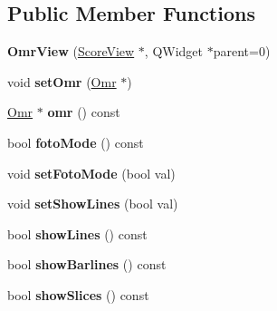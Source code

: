 \subsection*{Public Member Functions}
\begin{DoxyCompactItemize}
\item 
\mbox{\label{class_ms_1_1_omr_view_afa1b39091598c79514a603e1edc46ceb}} 
{\bfseries Omr\+View} (\hyperlink{class_ms_1_1_score_view}{Score\+View} $\ast$, Q\+Widget $\ast$parent=0)
\item 
\mbox{\label{class_ms_1_1_omr_view_a0c1d193268688ea084e67cb2d389e9c7}} 
void {\bfseries set\+Omr} (\hyperlink{class_ms_1_1_omr}{Omr} $\ast$)
\item 
\mbox{\label{class_ms_1_1_omr_view_a796985fe19ac9e85ab5a8866d3511617}} 
\hyperlink{class_ms_1_1_omr}{Omr} $\ast$ {\bfseries omr} () const
\item 
\mbox{\label{class_ms_1_1_omr_view_a06842c9103a90f04fcf2a032312af50d}} 
bool {\bfseries foto\+Mode} () const
\item 
\mbox{\label{class_ms_1_1_omr_view_a4aab6e15d21579043bef3ff588786a21}} 
void {\bfseries set\+Foto\+Mode} (bool val)
\item 
\mbox{\label{class_ms_1_1_omr_view_a73d9c49daadc4c019a18e87a322d39cf}} 
void {\bfseries set\+Show\+Lines} (bool val)
\item 
\mbox{\label{class_ms_1_1_omr_view_a7d2e46caf93296b99f358c721040029e}} 
bool {\bfseries show\+Lines} () const
\item 
\mbox{\label{class_ms_1_1_omr_view_a334a98291d25edc5e2dfcdeb95beef0d}} 
bool {\bfseries show\+Barlines} () const
\item 
\mbox{\label{class_ms_1_1_omr_view_aa7a50b132cb2b49838614c8a8b16b379}} 
bool {\bfseries show\+Slices} () const
\item 
\mbox{\label{class_ms_1_1_omr_view_af0d8e80004d528ed8af6290e3a82f11f}} 

\end{DoxyCompactItemize}
